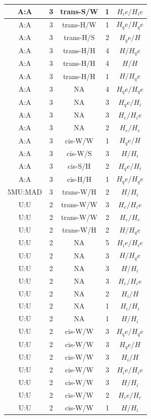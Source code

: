 \begin{center}
\begin{longtable}{c|c|c|c|c}
A:A & 3 & trans-S/W & 1 & $H_ie/H_ie$ \\  \hline
A:A & 3 & trans-H/W & 1 & $H_qe/H_qe$ \\  \hline
A:A & 3 & trans-H/S & 2 & $H_qe/H$ \\  \hline
A:A & 3 & trans-H/H & 4 & $H/H_qe$ \\  \hline
A:A & 3 & trans-H/H & 4 & $H/H$ \\  \hline
A:A & 3 & trans-H/H & 1 & $H/H_qe$ \\  \hline
A:A & 3 & NA & 4 & $H_qe/H_qe$ \\  \hline
A:A & 3 & NA & 3 & $H_qe/H_i$ \\  \hline
A:A & 3 & NA & 3 & $H_e/H_ie$ \\  \hline
A:A & 3 & NA & 2 & $H_e/H_e$ \\  \hline
A:A & 3 & cis-W/W & 1 & $H_qe/H$ \\  \hline
A:A & 3 & cis-W/S & 3 & $H/H_i$ \\  \hline
A:A & 3 & cis-S/H & 2 & $H_qe/H_i$ \\  \hline
A:A & 3 & cis-H/H & 1 & $H_qe/H_qe$ \\  \hline
5MU:MAD & 3 & trans-W/H & 2 & $H/H_i$ \\  \hline
U:U & 2 & trans-W/W & 3 & $H_e/H_ie$ \\  \hline
U:U & 2 & trans-W/W & 2 & $H_e/H_e$ \\  \hline
U:U & 2 & trans-W/H & 2 & $H/H_qe$ \\  \hline
U:U & 2 & NA & 5 & $H_ie/H_ie$ \\  \hline
U:U & 2 & NA & 3 & $H/H_qe$ \\  \hline
U:U & 2 & NA & 3 & $H/H_i$ \\  \hline
U:U & 2 & NA & 3 & $H_e/H_ie$ \\  \hline
U:U & 2 & NA & 2 & $H_i/H$ \\  \hline
U:U & 2 & NA & 1 & $H_i/H_i$ \\  \hline
U:U & 2 & NA & 1 & $H/H_i$ \\  \hline
U:U & 2 & cis-W/W & 3 & $H_qe/H_qe$ \\  \hline
U:U & 2 & cis-W/W & 3 & $H_qe/H$ \\  \hline
U:U & 2 & cis-W/W & 3 & $H_i/H$ \\  \hline
U:U & 2 & cis-W/W & 3 & $H_ie/H_ie$ \\  \hline
U:U & 2 & cis-W/W & 3 & $H/H_i$ \\  \hline
U:U & 2 & cis-W/W & 2 & $H_ie/H_e$ \\  \hline
U:U & 2 & cis-W/W & 1 & $H/H_i$ \\  \hline

\end{longtable}
\end{center}
